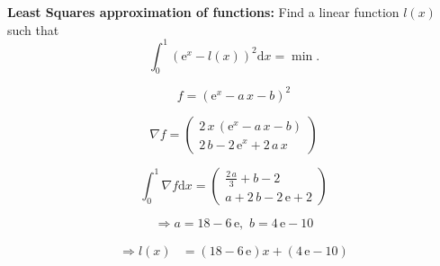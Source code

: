 \textbf{Least Squares approximation of functions:} Find a linear function $l(x)$ such that \[\int_0^1 (\mathrm{e}^x - l(x))^2 \text{d}x = \min.\]

{\color{blue}

\[
f = {\left(\mathrm{e}^{x} - a\, x - b\right)}^2
\]

\[
\nabla f =
\left(\begin{array}{c} 2\, x\, \left(\mathrm{e}^{x} - a\, x - b\right)\\ 2\, b - 2\, \mathrm{e}^{x} + 2\, a\, x \end{array}\right)
\]

\[
\int_0^1 \nabla f \text{d}x =
\left(\begin{array}{c} \frac{2\, a}{3} + b - 2\\ a + 2\, b - 2\, \mathrm{e} + 2 \end{array}\right)
\]

\[
\Rightarrow a = 18 - 6\, \mathrm{e},\,\, b = 4\, \mathrm{e} - 10
\]

\[
\begin{aligned}
\Rightarrow l(x) &= (18 - 6 \, \mathrm{e}) x + (4 \, \mathrm{e} - 10)
\end{aligned}
\]

}
